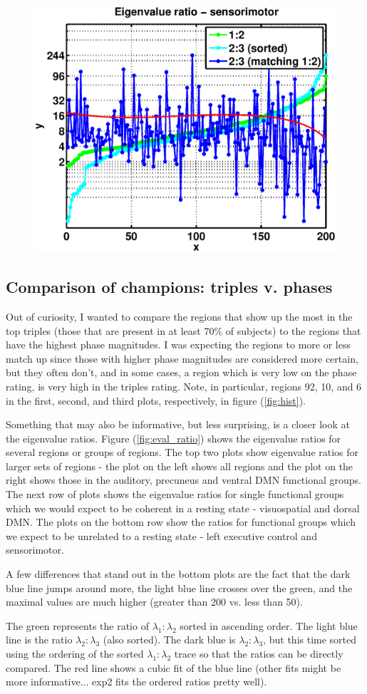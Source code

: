 \documentclass[11pt]{article}
\begin{document}
\begin{figure}
\includegraphics[width=.45\textwidth]{pictures/eval_ratio_new_FIND_sensorimotor.eps}
\caption{}
\end{figure}
\subsection{Comparison of champions: triples v. phases}
Out of curiosity, I wanted to compare the regions that show up the most in the top triples (those that are present in at least 70\% of subjects) to the regions that have the highest phase magnitudes. I was expecting the regions to more or less match up since those with higher phase magnitudes are considered more certain, but they often don't, and in some cases, a region which is very low on the phase rating, is very high in the triples rating. Note, in particular, regions 92, 10, and 6 in the first, second, and third plots, respectively, in figure (\ref{fig:hist}).

Something that may also be informative, but less surprising, is a closer look at the eigenvalue ratios. Figure (\ref{fig:eval_ratio}) shows the eigenvalue ratios for several regions or groups of regions. The top two plots show eigenvalue ratios for larger sets of regions - the plot on the left shows all regions and the plot on the right shows those in the auditory, precuneus and ventral DMN functional groups. The next row of plots shows the eigenvalue ratios for single functional groups which we would expect to be coherent in a resting state - visuospatial and dorsal DMN. The plots on the bottom row show the ratios for functional groups which we expect to be unrelated to a resting state - left executive control and sensorimotor. 

A few differences that stand out in the bottom plots are the fact that the dark blue line jumps around more, the light blue line crosses over the green, and the maximal values are much higher (greater than 200 vs. less than 50). 

The green represents the ratio of $\lambda_1:\lambda_2$ sorted in ascending order. The light blue line is the ratio $\lambda_2:\lambda_3$ (also sorted). The dark blue is $\lambda_2:\lambda_3$, but this time sorted using the ordering of the sorted $\lambda_1:\lambda_2$ trace so that the ratios can be directly compared. The red line shows a cubic fit of the blue line (other fits might be more informative... exp2 fits the ordered ratios pretty well).
\end{document}
